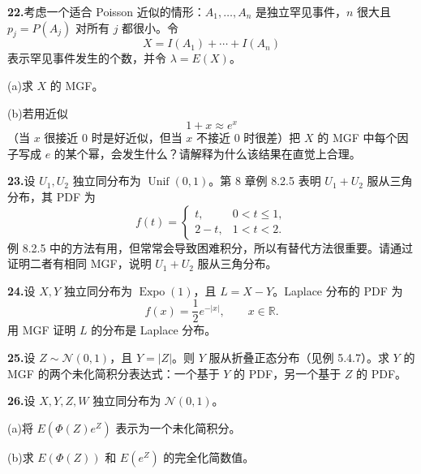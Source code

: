 \documentclass[UTF8, 12pt, fontset=fandol, oneside]{ctexart}
\begin{document}
\noindent\textbf{22.}\quad 考虑一个适合 Poisson 近似的情形：$A_1,\ldots,A_n$ 是独立罕见事件，$n$ 很大且 $p_j=P(A_j)$ 对所有 $j$ 都很小。令
\[
  X=I(A_1)+\cdots+I(A_n)
\]
表示罕见事件发生的个数，并令 $\lambda=E(X)$。

\noindent (a)\quad 求 $X$ 的 MGF。

\noindent (b)\quad 若用近似
\[
  1+x\approx e^x
\]
（当 $x$ 很接近 $0$ 时是好近似，但当 $x$ 不接近 $0$ 时很差）把 $X$ 的 MGF 中每个因子写成 $e$ 的某个幂，会发生什么？请解释为什么该结果在直觉上合理。

\noindent\textbf{23.}\quad 设 $U_1,U_2$ 独立同分布为 $\operatorname{Unif}(0,1)$。第 8 章例 8.2.5 表明 $U_1+U_2$ 服从三角分布，其 PDF 为
\[
  f(t)=
  \begin{cases}
    t,&0<t\le1,\\
    2-t,&1<t<2.
  \end{cases}
\]
例 8.2.5 中的方法有用，但常常会导致困难积分，所以有替代方法很重要。请通过证明二者有相同 MGF，说明 $U_1+U_2$ 服从三角分布。

\noindent\textbf{24.}\quad 设 $X,Y$ 独立同分布为 $\operatorname{Expo}(1)$，且 $L=X-Y$。Laplace 分布的 PDF 为
\[
  f(x)=\frac12e^{-|x|},\qquad x\in\mathbb{R}.
\]
用 MGF 证明 $L$ 的分布是 Laplace 分布。

\noindent\textbf{25.}\quad 设 $Z\sim\mathcal{N}(0,1)$，且 $Y=|Z|$。则 $Y$ 服从折叠正态分布（见例 5.4.7）。求 $Y$ 的 MGF 的两个未化简积分表达式：一个基于 $Y$ 的 PDF，另一个基于 $Z$ 的 PDF。

\noindent\textbf{26.}\quad 设 $X,Y,Z,W$ 独立同分布为 $\mathcal{N}(0,1)$。

\noindent (a)\quad 将 $E(\Phi(Z)e^Z)$ 表示为一个未化简积分。

\noindent (b)\quad 求 $E(\Phi(Z))$ 和 $E(e^Z)$ 的完全化简数值。
\end{document}

